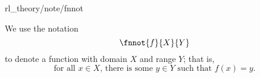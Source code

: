 \documentclass{rl_theory/rl_theory}
\begin{document}
\begin{reference}{rl_theory/note/fnnot}
  \begin{note}
    We use the notation
    $$\fnnot{f}{X}{Y}$$
    to denote a function with domain $X$ and range $Y$;
    that is, 
    $$\text{for all $x \in X$, there is some $y \in Y$ such that $f(x) = y$}.$$%
  \end{note}
\end{reference}
\end{document}

